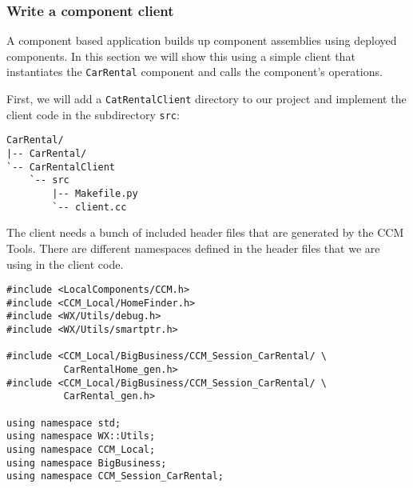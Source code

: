 \subsubsection{Write a component client}

A component based application builds up component assemblies using deployed 
components. In this section we will show this using a simple client that
instantiates the {\tt CarRental} component and calls the component's operations.

First, we will add a {\tt CatRentalClient} directory to our project and implement
the client code in the subdirectory {\tt src}:
\begin{small}
\begin{verbatim}
CarRental/
|-- CarRental/
`-- CarRentalClient
    `-- src
        |-- Makefile.py
        `-- client.cc
\end{verbatim}
\end{small}

The client needs a bunch of included header files that are generated by the 
CCM Tools.
There are different namespaces defined in the header files that we are using 
in the client code.
\begin{small}
\begin{verbatim}
#include <LocalComponents/CCM.h>
#include <CCM_Local/HomeFinder.h>
#include <WX/Utils/debug.h>
#include <WX/Utils/smartptr.h>

#include <CCM_Local/BigBusiness/CCM_Session_CarRental/ \
          CarRentalHome_gen.h>
#include <CCM_Local/BigBusiness/CCM_Session_CarRental/ \
          CarRental_gen.h>

using namespace std;
using namespace WX::Utils;
using namespace CCM_Local;
using namespace BigBusiness;
using namespace CCM_Session_CarRental;
\end{verbatim}
\end{small}

